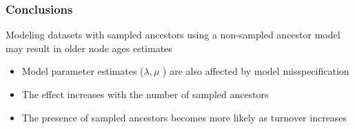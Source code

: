 \documentclass[]{beamer}
\begin{document}
\begin{frame}
\frametitle{Conclusions}
Modeling datasets with sampled ancestors using a non-sampled ancestor model may result in older node ages estimates
\begin{itemize}
\item Model parameter estimates (\(\lambda, \mu \) ) are also affected by model misspecification
\item The effect increases with the number of sampled ancestors
\item The presence of sampled ancestors becomes more likely as turnover increases
\end{itemize}
\end{frame}

\end{document}
